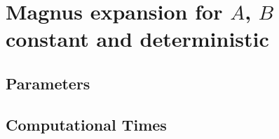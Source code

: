 \section{Magnus expansion for $A$, $B$ constant and deterministic}
	
\subsection{Parameters}
	
\subsection{Computational Times}
	
